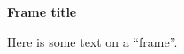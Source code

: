 \documentclass[11pt]{article}
\begin{document}
\textbf{\Large Frame title}

Here is some text on a ``frame''.
\end{document}
